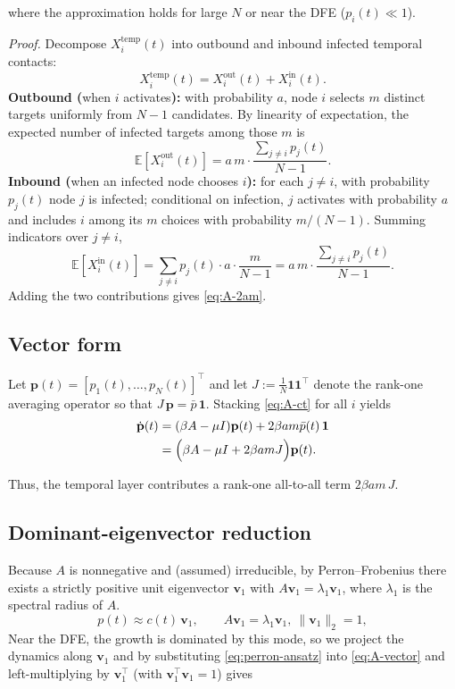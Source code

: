 \documentclass[pdflatex,sn-mathphys-num]{sn-jnl}%
\theoremstyle{thmstyleone}%
\theoremstyle{thmstyletwo}%
\theoremstyle{thmstylethree}%
\begin{document}
\begin{appendices}
where the approximation holds for large $N$ or near the DFE ($p_i(t)\ll1$).

\emph{Proof.}
Decompose $X_i^{\mathrm{temp}}(t)$ into outbound and inbound infected temporal contacts:
\[
X_i^{\mathrm{temp}}(t)=X_i^{\mathrm{out}}(t)+X_i^{\mathrm{in}}(t).
\]
\textbf{Outbound (}when $i$ activates\textbf{):} with probability $a$, node $i$ selects $m$ distinct targets uniformly from $N-1$ candidates.
By linearity of expectation, the expected number of infected targets among those $m$ is
\[
\mathbb{E}\!\left[X_i^{\mathrm{out}}(t)\right]
= a\,m\cdot \frac{\sum_{j\ne i} p_j(t)}{N-1}.
\]
\textbf{Inbound (}when an infected node chooses $i$\textbf{):}
for each $j\ne i$, with probability $p_j(t)$ node $j$ is infected; conditional on infection, $j$ activates with probability $a$ and includes $i$ among its $m$ choices with probability $m/(N-1)$. Summing indicators over $j\ne i$,
\[
\mathbb{E}\!\left[X_i^{\mathrm{in}}(t)\right]
= \sum_{j\ne i} p_j(t)\cdot a\cdot \frac{m}{N-1}
= a\,m\cdot\frac{\sum_{j\ne i} p_j(t)}{N-1}.
\]
Adding the two contributions gives \eqref{eq:A-2am}.


\subsection{Vector form}
Let $\mathbf{p}(t)=[p_1(t),\dots,p_N(t)]^\top$ and let
$J:=\tfrac{1}{N}\mathbf{1}\mathbf{1}^\top$ denote the rank-one averaging operator so that
$J\,\mathbf{p}=\bar p\,\mathbf{1}$. Stacking \eqref{eq:A-ct} for all $i$ yields
\begin{equation}
\begin{split}
\dot{\mathbf{p}}(t)
  &= (\beta A - \mu I)\mathbf{p}(t)
    + 2\beta a m\bar{p}(t)\,\mathbf{1} \\
  &= \Bigl(\beta A - \mu I + 2\beta a m J\Bigr)\mathbf{p}(t).
\end{split}
\label{eq:A-vector}
\end{equation}

Thus, the temporal layer contributes a rank-one all-to-all term $2\beta a m\,J$.

\subsection{Dominant-eigenvector reduction}
\label{app:proof-threshold}
Because $A$ is nonnegative and (assumed) irreducible, by Perron–Frobenius there exists
a strictly positive unit eigenvector $\mathbf{v}_1$ with $A\mathbf{v}_1=\lambda_1\mathbf{v}_1$,
where $\lambda_1$ is the spectral radius of $A$. 
\begin{equation}
p(t) \approx c(t)\,\mathbf{v}_1, 
\qquad A\mathbf{v}_1=\lambda_1\mathbf{v}_1,\ \|\mathbf{v}_1\|_2=1,
\label{eq:perron-ansatz}
\end{equation}
Near the DFE, the growth is dominated by this mode, so we project the dynamics along $\mathbf{v}_1$ and by substituting \eqref{eq:perron-ansatz} into \eqref{eq:A-vector} and left-multiplying by
$\mathbf{v}_1^\top$ (with $\mathbf{v}_1^\top\mathbf{v}_1=1$) gives


\end{appendices}
\end{document}
